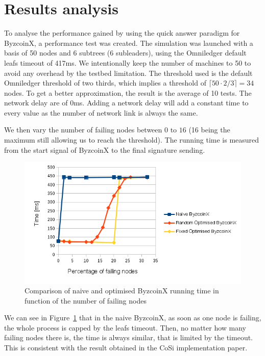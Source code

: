 \documentclass[11pt, a4paper, twoside, openright]{article}
\begin{document}
\section{Results analysis}

To analyse the performance gained by using the quick answer paradigm for ByzcoinX, a performance test was created. The simulation was launched with a basis of 50 nodes and 6 subtrees (6 subleaders), using the Omniledger default leafs timeout of 417ms. We intentionally keep the number of machines to 50 to avoid any overhead by the testbed limitation. The threshold used is the default Omniledger threshold of two thirds, which implies a threshold of $ {\lceil 50 \cdot 2/3\rceil} = 34$ nodes. To get a better approximation, the result is the average of 10 tests. The network delay are of 0ms. Adding a network delay will add a constant time to every value as the number of network link is always the same. 

We then vary the number of failing nodes between $0 \text{ to } 16$ (16 being the maximum still allowing us to reach the threshold). The running time is measured from the start signal of ByzcoinX to the final signature sending.
\begin{figure}
 \centering
  \includegraphics[width=\textwidth]{time_ByzcoinX.png}
  \caption{Comparison of naive and optimised ByzcoinX running time in function of the number of failing nodes}
  \label{fig:performance}
\end{figure}

We can see in Figure~\ref{fig:performance} that in the naive ByzcoinX, as soon as one node is failing, the whole process is capped by the leafs timeout. Then, no matter how many failing nodes there is, the time is always similar, that is limited by the timeout. This is consistent with the result obtained in the CoSi implementation paper\cite{CoSi_implementation}.
\end{document}

